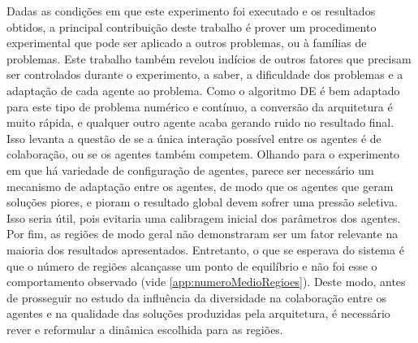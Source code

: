 Dadas as condições em que este experimento foi executado e os resultados obtidos, a principal contribuição deste trabalho é prover um procedimento experimental que pode ser aplicado a outros problemas, ou à famílias de problemas. Este trabalho também revelou indícios de outros fatores que precisam ser controlados durante o experimento, a saber, a dificuldade dos problemas e a adaptação de cada agente ao problema. Como o algoritmo DE é bem adaptado para este tipo de problema numérico e contínuo, a conversão da arquitetura é muito rápida, e qualquer outro agente acaba gerando ruido no resultado final. Isso levanta a questão de se a única interação possível entre os agentes é de colaboração, ou se os agentes também competem. Olhando para o experimento em que há variedade de configuração de agentes, parece ser necessário um mecanismo de adaptação entre os agentes, de modo que os agentes que geram soluções piores, e pioram o resultado global devem sofrer uma pressão seletiva. Isso seria útil, pois evitaria uma calibragem inicial dos parâmetros dos agentes. Por fim, as regiões de modo geral não demonstraram ser um fator relevante na maioria dos resultados apresentados. Entretanto, o que se esperava do sistema é que o número de regiões alcançasse um ponto de equilíbrio e não foi esse o comportamento observado (vide \autoref{app:numeroMedioRegioes}). Deste modo, antes de prosseguir no estudo da influência da diversidade na colaboração entre os agentes e na qualidade das soluções produzidas pela arquitetura, é necessário rever e reformular a dinâmica escolhida para as regiões.
